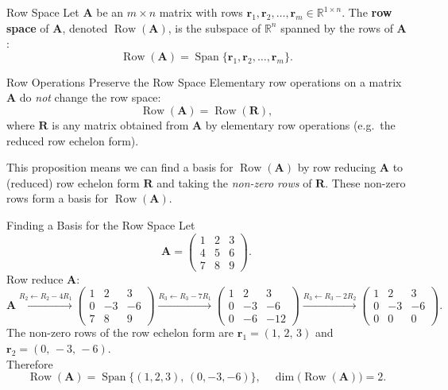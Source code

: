 \documentclass[12pt,a4paper]{article}
\newcommand{\R}{\mathbb{R}}
\newcommand{\vv}[1]{\mathbf{#1}}
\newcommand{\Span}{\operatorname{Span}}
\newcommand{\Row}{\operatorname{Row}}
\newcommand{\mat}[1]{\mathbf{#1}}
\begin{document}
	\begin{defbox}{Row Space}{}
		Let \(\mat{A}\) be an \(m \times n\) matrix with rows
		\(\vv{r}_1, \vv{r}_2, \ldots, \vv{r}_m \in \R^{1 \times n}\).
		The \textbf{row space} of \(\mat{A}\), denoted \(\Row(\mat{A})\), is the subspace of
		\(\R^n\) spanned by the rows of \(\mat{A}\):
		\[
		\Row(\mat{A}) = \Span\{\vv{r}_1, \vv{r}_2, \ldots, \vv{r}_m\}.
		\]
	\end{defbox}
	
	\begin{propbox}{Row Operations Preserve the Row Space}{}
		Elementary row operations on a matrix \(\mat{A}\) do \emph{not} change the row space:
		\[
		\Row(\mat{A}) = \Row(\mat{R}),
		\]
		where \(\mat{R}\) is any matrix obtained from \(\mat{A}\) by elementary row operations
		(e.g.\ the reduced row echelon form).
	\end{propbox}
	
	\begin{remarkbox}{}{}
		This proposition means we can find a basis for \(\Row(\mat{A})\) by row reducing
		\(\mat{A}\) to (reduced) row echelon form \(\mat{R}\) and taking the \emph{non-zero rows}
		of \(\mat{R}\). These non-zero rows form a basis for \(\Row(\mat{A})\).
	\end{remarkbox}
	
	\begin{exbox}{Finding a Basis for the Row Space}{}
		Let
		\[
		\mat{A} =
		\begin{pmatrix}
			1 & 2 & 3 \\
			4 & 5 & 6 \\
			7 & 8 & 9
		\end{pmatrix}.
		\]
		Row reduce \(\mat{A}\):
		\[
		\mat{A}
		\xrightarrow{R_2 \leftarrow R_2 - 4R_1}
		\begin{pmatrix}
			1 & 2 & 3 \\
			0 & -3 & -6 \\
			7 & 8 & 9
		\end{pmatrix}
		\xrightarrow{R_3 \leftarrow R_3 - 7R_1}
		\begin{pmatrix}
			1 & 2 & 3 \\
			0 & -3 & -6 \\
			0 & -6 & -12
		\end{pmatrix}
		\xrightarrow{R_3 \leftarrow R_3 - 2R_2}
		\begin{pmatrix}
			1 & 2 & 3 \\
			0 & -3 & -6 \\
			0 & 0 & 0
		\end{pmatrix}.
		\]
		The non-zero rows of the row echelon form are
		\(\vv{r}_1 = (1,\,2,\,3)\) and \(\vv{r}_2 = (0,\,-3,\,-6)\).\\[4pt]
		Therefore
		\[
		\Row(\mat{A}) = \Span\bigl\{(1,2,3),\,(0,-3,-6)\bigr\},
		\quad \dim\bigl(\Row(\mat{A})\bigr) = 2.
		\]
	\end{exbox}
	
\end{document}
